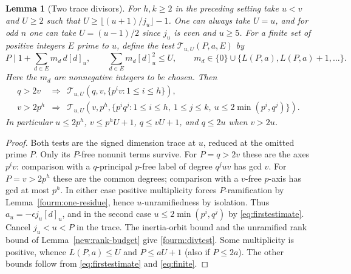 \documentclass[11pt,a4paper]{article}
\numberwithin{equation}{section}
\newtheorem{lemma}[theorem]{Lemma}
\theoremstyle{remark}
\begin{document}
\begin{lemma}[Two trace divisors]\label{fam:M:8.14}\label{fourm:trace-divisors}
For $h,k\ge2$ in the preceding setting take $u<v$ and $U\ge2$ such that
$U\ge\lfloor(u+1)/j_u\rfloor-1$. One can always take $U=u$,
and for odd $n$ one can take $U=(u-1)/2$ since $j_u$ is even
and $u\ge5$.
For a finite set of positive integers $E$ prime to $u$, define the test
$\mathcal T_{u,U}(P,a,E)$ by
\begin{equation}\label{fourm:divtest}
 P\mid 1+\sum_{d\in E}m_d\,d[d]_u,\qquad
 \sum_{d\in E}m_d[d]_u^2\le U,\qquad
 m_d\in\{0\}\cup\{L(P,a),L(P,a)+1,\ldots\}.
\end{equation}
Here the $m_d$ are nonnegative integers to be chosen. Then
\[
\begin{array}{lll}
 q>2v&\Longrightarrow&
 \mathcal T_{u,U}(q,v,\{p^iv:1\le i\le h\}),\\
 v>2p^h&\Longrightarrow&
 \mathcal T_{u,U}(v,p^h,\{p^iq^j:1\le i\le h,\ 1\le j\le k,\ u\le2\min(p^i,q^j)\}).
\end{array}
\]
In particular $u\le2p^h$, $v\le p^h U+1$, $q\le vU+1$,
and $q\le2u$ when $v>2u$.
\end{lemma}
\begin{proof}
Both tests are the signed dimension trace at $u$, reduced at the
omitted prime $P$. Only its $P$-free nonunit terms survive. For
$P=q>2v$ these are the axes $p^iv$:
comparison with a $q$-principal $p$-free label of degree $q^juv$
has gcd $v$. For $P=v>2p^h$ these are the common degrees; comparison
with a $v$-free $p$-axis has gcd at most $p^h$. In either case
positive multiplicity forces $P$-ramification by
Lemma~\ref{fourm:one-residue}, hence $u$-unramifiedness by isolation.
Thus $a_u=-\epsilon j_u[d]_u$, and in the second case
$u\le2\min(p^i,q^j)$ by \eqref{eq:firstestimate}.
Cancel $j_u<u<P$ in the trace. The inertia-orbit bound
and the unramified rank bound of Lemma~\ref{new:rank-budget} give
\eqref{fourm:divtest}. Some multiplicity is positive, whence
$L(P,a)\le U$ and $P\le aU+1$ (also if $P\le2a$).
The other bounds follow from \eqref{eq:firstestimate}
and \eqref{eq:finite}.
\end{proof}
\end{document}
